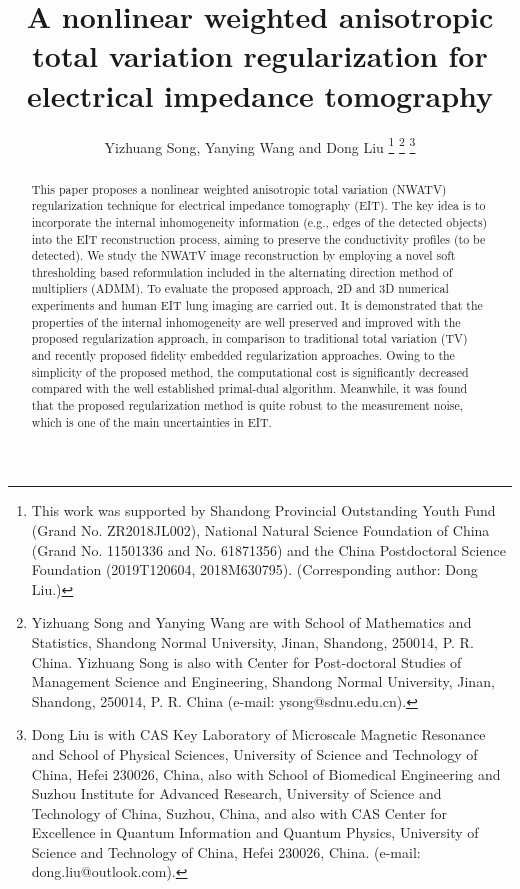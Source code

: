 \documentclass[lettersize,journal]{IEEEtran}
\begin{document}
\title{A nonlinear weighted anisotropic total variation regularization for electrical impedance tomography}
\author{Yizhuang Song, Yanying Wang and Dong Liu
\thanks{This work was supported by Shandong Provincial Outstanding Youth Fund (Grand No. ZR2018JL002), National Natural Science Foundation of China (Grand No. 11501336 and No. 61871356) and the China Postdoctoral Science Foundation (2019T120604, 2018M630795). (Corresponding author: Dong Liu.)}
\thanks{Yizhuang Song and Yanying Wang are with School of Mathematics and Statistics, Shandong Normal University, Jinan, Shandong, 250014, P. R. China. Yizhuang Song is also with Center for Post-doctoral Studies of Management Science and Engineering, Shandong Normal University, Jinan, Shandong, 250014, P. R. China (e-mail: ysong@sdnu.edu.cn).}
\thanks{Dong Liu is with CAS Key Laboratory of Microscale Magnetic Resonance and School of Physical Sciences, University of Science and Technology of China, Hefei 230026, China, also with School of Biomedical Engineering and Suzhou Institute for Advanced
Research, University of Science and Technology of China, Suzhou, China, and also with CAS Center for Excellence in Quantum Information and Quantum Physics, University of Science and Technology of China, Hefei 230026, China.  (e-mail: dong.liu@outlook.com).}}



\maketitle

\begin{abstract}
This paper proposes a nonlinear weighted anisotropic total variation (NWATV) regularization technique for electrical impedance tomography (EIT).
The key idea is to incorporate the internal inhomogeneity information (e.g., edges of the detected objects) into the EIT reconstruction process,
aiming to preserve the conductivity profiles (to be detected).
We study the NWATV image reconstruction by employing a novel soft thresholding based reformulation included in the alternating direction method of multipliers (ADMM).
To evaluate the proposed approach, 2D and 3D numerical experiments and human EIT lung imaging are carried out.
It is demonstrated that the properties of the internal inhomogeneity are well preserved and improved with the proposed regularization approach, in comparison to traditional total variation (TV) and recently proposed fidelity embedded regularization approaches.
Owing to the simplicity of the proposed method, the computational cost is significantly decreased compared with the well established primal-dual algorithm.
Meanwhile, it was found that the proposed regularization method is quite robust to the measurement noise, which is one of the main uncertainties in EIT.
\end{abstract}
\end{document}
